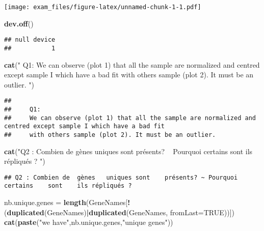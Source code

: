 \documentclass[]{article}
\newenvironment{Shaded}{\begin{snugshade}}{\end{snugshade}}
\newcommand{\KeywordTok}[1]{\textcolor[rgb]{0.13,0.29,0.53}{\textbf{#1}}}
\newcommand{\DataTypeTok}[1]{\textcolor[rgb]{0.13,0.29,0.53}{#1}}
\newcommand{\StringTok}[1]{\textcolor[rgb]{0.31,0.60,0.02}{#1}}
\newcommand{\OtherTok}[1]{\textcolor[rgb]{0.56,0.35,0.01}{#1}}
\newcommand{\OperatorTok}[1]{\textcolor[rgb]{0.81,0.36,0.00}{\textbf{#1}}}
\newcommand{\NormalTok}[1]{#1}
\begin{document}
\texttt{[image: exam\_files/figure-latex/unnamed-chunk-1-1.pdf]}

\begin{Shaded}
\begin{Highlighting}[]
\KeywordTok{dev.off}\NormalTok{()}
\end{Highlighting}
\end{Shaded}

\begin{verbatim}
## null device 
##           1
\end{verbatim}

\begin{Shaded}
\begin{Highlighting}[]
\KeywordTok{cat}\NormalTok{(}\StringTok{"}
\StringTok{    Q1:}
\StringTok{    We can observe (plot 1) that all the sample are normalized and centred except sample I which have a bad fit}
\StringTok{    with others sample (plot 2). It must be an outlier.}
\StringTok{"}\NormalTok{)}
\end{Highlighting}
\end{Shaded}

\begin{verbatim}
## 
##     Q1:
##     We can observe (plot 1) that all the sample are normalized and centred except sample I which have a bad fit
##     with others sample (plot 2). It must be an outlier.
\end{verbatim}

\begin{Shaded}
\begin{Highlighting}[]
\KeywordTok{cat}\NormalTok{(}\StringTok{"Q2 : Combien   de  gènes   uniques sont    présents? ~ Pourquoi    certains    sont    ils répliqués ? "}\NormalTok{)}
\end{Highlighting}
\end{Shaded}

\begin{verbatim}
## Q2 : Combien de  gènes   uniques sont    présents? ~ Pourquoi    certains    sont    ils répliqués ?
\end{verbatim}

\begin{Shaded}
\begin{Highlighting}[]
\NormalTok{nb.unique.genes =}\StringTok{  }\KeywordTok{length}\NormalTok{(GeneNames[}\OperatorTok{!}\NormalTok{(}\KeywordTok{duplicated}\NormalTok{(GeneNames)}\OperatorTok{|}\KeywordTok{duplicated}\NormalTok{(GeneNames, }\DataTypeTok{fromLast=}\OtherTok{TRUE}\NormalTok{))])}
\KeywordTok{cat}\NormalTok{(}\KeywordTok{paste}\NormalTok{(}\StringTok{"we have"}\NormalTok{,nb.unique.genes,}\StringTok{"unique genes"}\NormalTok{))}
\end{Highlighting}
\end{Shaded}
\end{document}
